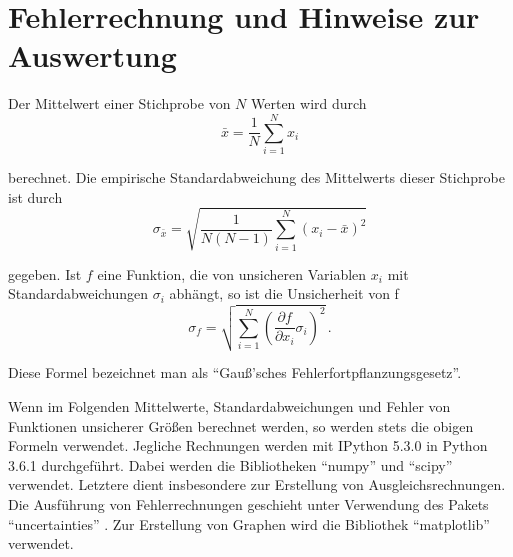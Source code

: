 \section{Fehlerrechnung und Hinweise zur Auswertung}
\label{sec:Fehlerrechnung}
Der Mittelwert einer Stichprobe von $N$ Werten wird durch
\begin{equation}
  \bar{x} = \frac{1}{N} \sum\limits_{i = 1}^N x_i
  \label{eqn:mean}
\end{equation}

berechnet.
Die empirische Standardabweichung des Mittelwerts dieser Stichprobe ist durch
\begin{equation}
  \sigma_{\bar{x}} = \sqrt{\frac{1}{N(N-1)}
    \sum\limits_{i = 1}^N
    (x_i-\bar{x})^2}
    \label{eqn:std}
\end{equation}

gegeben.
Ist $f$ eine Funktion, die von unsicheren Variablen $x_i$ mit
Standardabweichungen $\sigma_i$ abhängt, so ist die Unsicherheit von f
\begin{equation}
  \sigma_f = \sqrt{
    \sum\limits_{i = 1}^N
      \left( \frac{\partial f}{\partial x_i} \sigma_i \right)^{\!\! 2}
  }\,.
  \label{eqn:gaussfehler}
\end{equation}

Diese Formel bezeichnet man als \enquote{Gauß'sches Fehlerfortpflanzungsgesetz}.


Wenn im Folgenden Mittelwerte, Standardabweichungen und Fehler von
Funktionen unsicherer Größen berechnet werden, so werden stets die obigen
Formeln verwendet.
Jegliche Rechnungen werden mit IPython 5.3.0 in Python 3.6.1 durchgeführt. Dabei
werden die Bibliotheken \enquote{numpy} \cite{numpy} und \enquote{scipy} \cite{scipy} verwendet.
Letztere dient insbesondere zur Erstellung von Ausgleichsrechnungen.
Die Ausführung von Fehlerrechnungen geschieht unter Verwendung des Pakets
\enquote{uncertainties} \cite{uncertainties}. Zur Erstellung von Graphen wird die Bibliothek
\enquote{matplotlib} \cite{matplotlib} verwendet.
